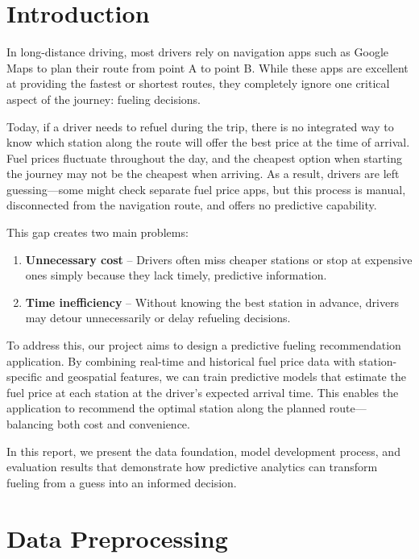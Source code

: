 \newpage
\chapter{Introduction}
In long-distance driving, most drivers rely on navigation apps such as Google Maps to plan their route from point A to point B. While these apps are excellent at providing the fastest or shortest routes, they completely ignore one critical aspect of the journey: fueling decisions.

Today, if a driver needs to refuel during the trip, there is no integrated way to know which station along the route will offer the best price at the time of arrival. Fuel prices fluctuate throughout the day, and the cheapest option when starting the journey may not be the cheapest when arriving. As a result, drivers are left guessing---some might check separate fuel price apps, but this process is manual, disconnected from the navigation route, and offers no predictive capability.

This gap creates two main problems:
\begin{enumerate}
    \item \textbf{Unnecessary cost} -- Drivers often miss cheaper stations or stop at expensive ones simply because they lack timely, predictive information.
    \item \textbf{Time inefficiency} -- Without knowing the best station in advance, drivers may detour unnecessarily or delay refueling decisions.
\end{enumerate}

To address this, our project aims to design a predictive fueling recommendation application. By combining real-time and historical fuel price data with station-specific and geospatial features, we can train predictive models that estimate the fuel price at each station at the driver’s expected arrival time. This enables the application to recommend the optimal station along the planned route---balancing both cost and convenience.

In this report, we present the data foundation, model development process, and evaluation results that demonstrate how predictive analytics can transform fueling from a guess into an informed decision.


\chapter{Data Preprocessing}
